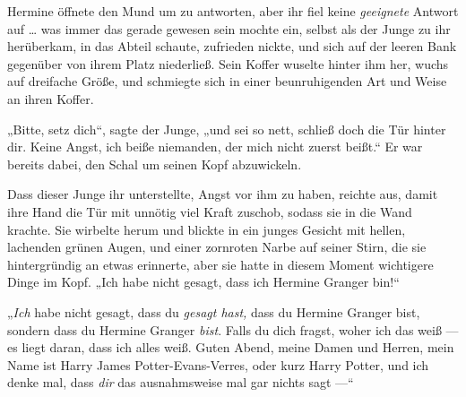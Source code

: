Hermine öffnete den Mund um zu antworten, aber ihr fiel keine \emph{geeignete} Antwort auf … was immer das gerade gewesen sein mochte ein, selbst als der Junge zu ihr herüberkam, in das Abteil schaute, zufrieden nickte, und sich auf der leeren Bank gegenüber von ihrem Platz niederließ. Sein Koffer wuselte hinter ihm her, wuchs auf dreifache Größe, und schmiegte sich in einer beunruhigenden Art und Weise an ihren Koffer.

„Bitte, setz dich“, sagte der Junge, „und sei so nett, schließ doch die Tür hinter dir. Keine Angst, ich beiße niemanden, der mich nicht zuerst beißt.“ Er war bereits dabei, den Schal um seinen Kopf abzuwickeln.

Dass dieser Junge ihr unterstellte, Angst vor ihm zu haben, reichte aus, damit ihre Hand die Tür mit unnötig viel Kraft zuschob, sodass sie in die Wand krachte. Sie wirbelte herum und blickte in ein junges Gesicht mit hellen, lachenden grünen Augen, und einer zornroten Narbe auf seiner Stirn, die sie hintergründig an etwas erinnerte, aber sie hatte in diesem Moment wichtigere Dinge im Kopf.
„Ich habe nicht gesagt, dass ich Hermine Granger bin!“

„\emph{Ich} habe nicht gesagt, dass du \emph{gesagt hast,} dass du Hermine Granger bist, sondern dass du Hermine Granger \emph{bist}. Falls du dich fragst, woher ich das weiß — es liegt daran, dass ich alles weiß. Guten Abend, meine Damen und Herren, mein Name ist Harry James Potter-Evans-Verres, oder kurz Harry Potter, und ich denke mal, dass \emph{dir} das ausnahmsweise mal gar nichts sagt —“

